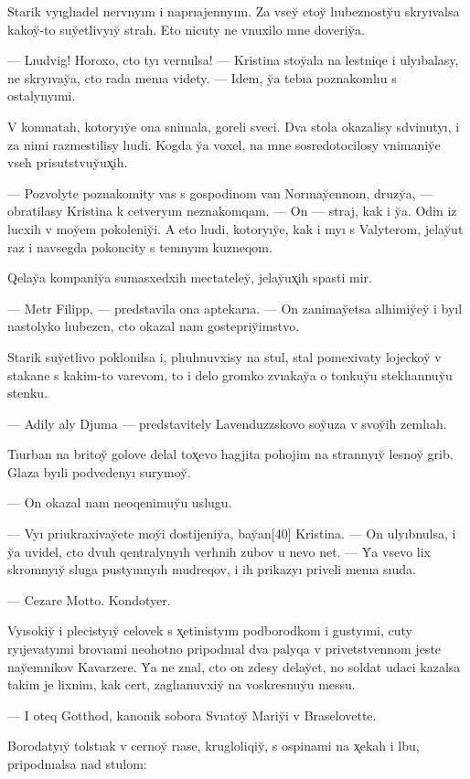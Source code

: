 \documentclass[10pt]{book}
\begin{document}
Starik vyıglıadel nervnyım i naprıajennyım. Za vsey̆ etoy̆ lıubeznosty̆u skryıvalsa kakoy̆-to suy̆etlivyıy̆ strah. Eto nicuty ne vnuxilo mne doveriy̆a.

— Lıudvig! Horoxo, cto tyı vernulsa! — Kristina stoy̆ala na lestniqe i ulyıbalasy, ne skryıvay̆a, cto rada menıa videty. — Idem, y̆a tebıa poznakomlıu s ostalynyımi.

V komnatah, kotoryıy̆e ona snimala, goreli sveci. Dva stola okazalisy sdvinutyı, i za nimi razmestilisy lıudi. Kogda y̆a voxel, na mne sosredotocilosy vnimaniy̆e vseh prisutstvuy̆ux̨ih.

— Pozvolyte poznakomity vas s gospodinom van Normay̆ennom, druzy̆a, — obratilasy Kristina k cetveryım neznakomqam. — On — straj, kak i y̆a. Odin iz lucxih v moy̆em pokoleniy̆i. A eto lıudi, kotoryıy̆e, kak i myı s Valyterom, jelay̆ut raz i navsegda pokoncity s temnyım kuzneqom.

Qelay̆a kompaniy̆a sumasxedxih mectateley̆, jelay̆ux̨ih spasti mir.

— Metr Filipp, — predstavila ona aptekarıa. — On zanimay̆etsa alhimiy̆ey̆ i byıl nastolyko lıubezen, cto okazal nam gostepriy̆imstvo.

Starik suy̆etlivo poklonilsa i, plıuhnuvxisy na stul, stal pomexivaty lojeckoy̆ v stakane s kakim-to varevom, to i delo gromko zvıakay̆a o tonkuy̆u steklıannuy̆u stenku.

— Adily aly Djuma — predstavitely Lavenduzzskovo soy̆uza v svoy̆ih zemlıah.

Tıurban na britoy̆ golove delal tox̨evo hagjita pohojim na strannyıy̆ lesnoy̆ grib. Glaza byıli podvedenyı surymoy̆.

— On okazal nam neoqenimuy̆u uslugu.

— Vyı priukraxivay̆ete moy̆i dostijeniy̆a, bay̆an[40] Kristina. — On ulyıbnulsa, i y̆a uvidel, cto dvuh qentralynyıh verhnih zubov u nevo net. — Y̆a vsevo lix skromnyıy̆ sluga pustyınnyıh mudreqov, i ih prikazyı priveli menıa sıuda.

— Cezare Motto. Kondotyer.

Vyısokiy̆ i plecistyıy̆ celovek s x̨etinistyım podborodkom i gustyımi, cuty ryıjevatyımi brovıami neohotno pripodnıal dva palyqa v privetstvennom jeste nay̆emnikov Kavarzere. Y̆a ne znal, cto on zdesy delay̆et, no soldat udaci kazalsa takim je lixnim, kak cert, zaglıanuvxiy̆ na voskresnuy̆u messu.

— I oteq Gotthod, kanonik sobora Svıatoy̆ Mariy̆i v Braselovette.

Borodatyıy̆ tolstıak v cernoy̆ rıase, krugloliqiy̆, s ospinami na x̨ekah i lbu, pripodnıalsa nad stulom:
\end{document}
